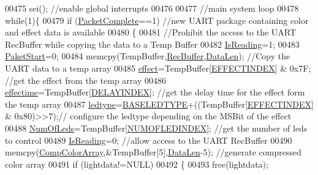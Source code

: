 \begin{DoxyCode}
{00475     sei();                                  \textcolor{comment}{//enable global interrupts}
00476 
00477     \textcolor{comment}{//main system loop}
00478     \textcolor{keywordflow}{while}(1)\{
00479         \textcolor{keywordflow}{if} (\hyperlink{globals_8h_a1b09d1a5bcf4c8ab435bb3c9e36def59}{PacketComplete}==1)    \textcolor{comment}{//new UART package containing color and effect data is
       available}
00480         \{
00481             \textcolor{comment}{//Prohibit the access to the UART RecBuffer while copying the data to a Temp Buffer}
00482             \hyperlink{globals_8h_a922ad5baed647eca43ad1a979e162ebd}{IsReading}=1;       
00483             \hyperlink{globals_8h_aaa3bddd2273257ac5ec259197b62e984}{PaketStart}=0;
00484             memcpy(TempBuffer,\hyperlink{globals_8h_a5d735865707e6694a8173d629e0b4d5c}{RecBuffer},\hyperlink{globals_8h_aaa611e00c18e950be43a4cd5ce0ceeb1}{DataLen});   \textcolor{comment}{//Copy the UART data to a temp array    }
00485             \hyperlink{globals_8h_a053b8e1f039c19251b90d60317db8aed}{effect}=TempBuffer[\hyperlink{ws2811lichterkette_8c_a8d4e4cf47dd6136ace963623e1a8e27c}{EFFECTINDEX}] & 0x7F; \textcolor{comment}{//get the effect from the temp array}
00486             \hyperlink{globals_8h_ac2445d316b2972d381edeac44bb6a226}{effectime}=TempBuffer[\hyperlink{ws2811lichterkette_8c_a9ff437877d0878dd16eacf103a1e1c40}{DELAYINDEX}];        \textcolor{comment}{//get the delay time for the effect
       form the temp array}
00487             \hyperlink{globals_8h_a722e1eb38b661d1338ada3cc7a4049a0}{ledtype}=\hyperlink{globals_8h_af07a5ce170c7be13d096843960e7b9da}{BASELEDTYPE}+((TempBuffer[\hyperlink{ws2811lichterkette_8c_a8d4e4cf47dd6136ace963623e1a8e27c}{EFFECTINDEX}] & 0x80)>>7);\textcolor{comment}{//
      configure the ledtype depending on the MSBit of the effect}
00488             \hyperlink{globals_8h_ad5db4045aed262ed4aae2af9d81fab98}{NumOfLeds}=TempBuffer[\hyperlink{ws2811lichterkette_8c_afbc75dc20761a05dda7cbb70b9b322dd}{NUMOFLEDINDEX}];  \textcolor{comment}{//get the number of leds to control}
00489             \hyperlink{globals_8h_a922ad5baed647eca43ad1a979e162ebd}{IsReading}=0;                           \textcolor{comment}{//allow access to the UART RecBuffer}
00490             memcpy(\hyperlink{globals_8h_a159854edb9d0c7283013495d85bdf997}{CompColorArray},&TempBuffer[5],\hyperlink{globals_8h_aaa611e00c18e950be43a4cd5ce0ceeb1}{DataLen}-5);   \textcolor{comment}{//generate compressed
       color array}
00491             \textcolor{keywordflow}{if} (lightdata!=NULL)
00492             \{
00493                 free(lightdata);
}
\end{DoxyCode}
